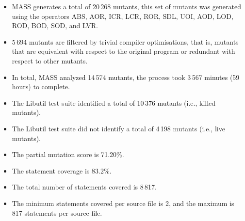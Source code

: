 \begin{itemize}
	\item MASS generates a total of 20\,268 mutants, this set of mutants was generated using the operators ABS, AOR, ICR, LCR, ROR, SDL, UOI, AOD, LOD, ROD, BOD, SOD, and LVR.

	\item 5\,694 mutants are filtered by trivial compiler optimisations, that is, mutants that are equivalent with respect to the original program or redundant with respect to other mutants.

	\item In total, MASS analyzed 14\,574 mutants, the process took 3\,567 minutes (59 hours) to complete.

	\item The Libutil test suite identified a total of 10\,376 mutants (i.e., killed mutants).

	\item The Libutil test suite did not identify a total of 4\,198 mutants (i.e., live mutants).

	\item The partial mutation score is 71.20\%.

	\item The statement coverage is 83.2\%.
	
	\item The total number of statements covered is 8\,817.
	
	\item The minimum statements covered per source file is 2, and the maximum is 817 statements per source file.
\end{itemize}

